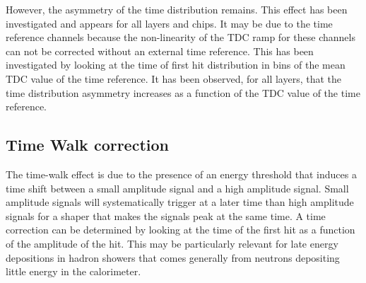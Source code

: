 However, the asymmetry of the time distribution remains. This effect has been investigated and appears for all layers and chips. It may be due to the time reference channels because the non-linearity of the TDC ramp for these channels can not be corrected without an external time reference. This has been investigated by looking at the time of first hit distribution in bins of the mean TDC value of the time reference. It has been observed, for all layers, that the time distribution asymmetry increases as a function of the TDC value of the time reference.

\subsection{Time Walk correction}
\label{subsec:timewalk}

The time-walk effect is due to the presence of an energy threshold that induces a time shift between a small amplitude signal and a high amplitude signal. Small amplitude signals will systematically trigger at a later time than high amplitude signals for a shaper that makes the signals peak at the same time. A time correction can be determined by looking at the time of the first hit as a function of the amplitude of the hit. This may be particularly relevant for late energy depositions in hadron showers that comes generally from neutrons depositing little energy in the calorimeter.


